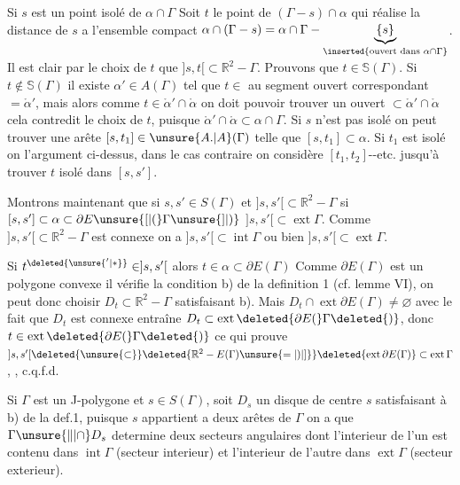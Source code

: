 Si $s$ est un point isolé de $\alpha\cap\Gamma$ Soit $t$ le point de $(\Gamma-s)\cap\alpha$ qui réalise la distance de $s$ a l'ensemble compact $\alpha\cap(\Gamma-s)=\alpha\cap\Gamma-\underbrace{\{s\}}_{\inserted{\text{ouvert dans }\alpha\cap\Gamma}}$. Il est clair par le choix de $t$ que $]s,t[\subset\mathbb{R}^{2}-\Gamma$. Prouvons que $t\in\mathbb{S}(\Gamma)$. Si $t\notin\mathbb{S}(\Gamma)$ il existe $\alpha'\in A(\Gamma)$ tel que $t\in$ au segment ouvert correspondant $=\mathring{\alpha}'$, mais alors comme $t\in\mathring{\alpha}'\cap\mathring{\alpha}$ on doit pouvoir trouver un ouvert $\subset\mathring{\alpha}'\cap\mathring{\alpha}$  cela contredit le choix de $t$, puisque $\mathring{\alpha}'\cap\mathring{\alpha}\subset\alpha\cap\Gamma$. Si $s$ n'est pas isolé on peut trouver une arête $[s,t_1]\in\unsure{A.|A}(\Gamma)$ telle que $[s,t_1]\subset\alpha$. Si $t_1$ est isolé on  l'argument ci-dessus, dans le cas contraire on considère $[t_1,t_2]$-{}-etc. jusqu'à trouver $t$ isolé dans $[s,s']$.

Montrons maintenant que si $s,s'\in S(\Gamma)$ et $]s,s'[\subset\mathbb{R}^{2}-\Gamma$ si $[s,s']\subset\alpha\subset\partial E\unsure{[|(}\Gamma\unsure{]|)}$ $]s,s'[\subset\operatorname{ext}\Gamma$.
Comme $]s,s'[\subset\mathbb{R}^{2}-\Gamma$ est connexe on a $]s,s'[\subset\operatorname{int}\Gamma$ ou bien $]s,s'[\subset\operatorname{ext}\Gamma$.

Si $t^{\deleted{\unsure{'|*}}}\in ]s,s'[$ alors $t\in\alpha\subset\partial E(\Gamma)$  Comme $\partial E(\Gamma)$ est un polygone convexe il vérifie la condition b) de la definition 1 (cf. lemme VI), on peut donc choisir $D_t\subset\mathbb{R}^{2}-\Gamma$ satisfaisant b). Mais $D_t\cap\operatorname{ext}\partial E(\Gamma)\ne\varnothing$  avec le fait que $D_t$ est connexe entraîne $D_t\subset\operatorname{ext}\deleted{\partial E(}\Gamma\deleted{)}$, donc $t\in\operatorname{ext}\deleted{\partial E(}\Gamma\deleted{)}$ ce qui prouve  $]s,s'[\deleted{\unsure{\subset}}\deleted{\mathbb{R}^{2}-E(\Gamma)\unsure{=|)|]}}\deleted{\operatorname{ext}\partial E(\Gamma)}\subset\operatorname{ext}\Gamma$, , c.q.f.d.

Si $\Gamma$ est un J-polygone et $s\in S(\Gamma)$, soit $D_s$ un disque de centre $s$ satisfaisant à b) de la def.1, puisque $s$ appartient a deux arêtes de $\Gamma$ on a que $\Gamma\unsure{\Vert|\cap}D_s$ determine deux secteurs angulaires dont l'interieur de l'un est contenu dans $\operatorname{int}\Gamma$ (secteur interieur) et l'interieur de l'autre dans $\operatorname{ext}\Gamma$ (secteur exterieur).

